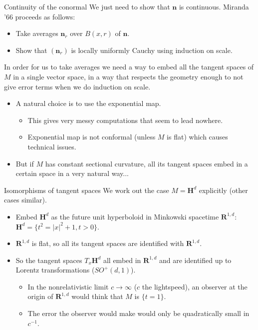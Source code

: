 \documentclass[10pt]{beamer}
\newcommand{\RR}{\mathbf{R}}
\newcommand{\Hyp}{\mathbf H}
\newcommand{\normal}{\mathbf n}
\begin{document}
\begin{frame}{Continuity of the conormal}
We just need to show that $\normal$ is continuous.
Miranda '66 proceeds as follows:\pause

\begin{itemize}
\item Take averages $\normal_r$ over $B(x, r)$ of $\normal$. \pause
\item Show that $(\normal_r)$ is locally uniformly Cauchy using induction on scale.\pause
\end{itemize}

In order for us to take averages we need a way to embed all the tangent spaces of $M$ in a single vector space, in a way that respects the geometry enough to not give error terms when we do induction on scale.\pause
\begin{itemize}
\item A natural choice is to use the exponential map.\pause
\begin{itemize}
\item This gives very messy computations that seem to lead nowhere.\pause
\item Exponential map is not conformal (unless $M$ is flat) which causes technical issues.\pause
\end{itemize}
\item But if $M$ has constant sectional curvature, all its tangent spaces embed in a certain space in a very natural way...
\end{itemize}
\end{frame}

\begin{frame}{Isomorphisms of tangent spaces}
We work out the case $M = \Hyp^d$ explicitly (other cases similar).\pause
\begin{itemize}
\item Embed $\Hyp^d$ as the future unit hyperboloid in Minkowski spacetime $\RR^{1, d}$: $\Hyp^d = \{t^2 = |x|^2 + 1, t > 0\}$.\pause
\item $\RR^{1, d}$ is flat, so all its tangent spaces are identified with $\RR^{1, d}$.\pause
\item So the tangent spaces $T_x\Hyp^d$ all embed in $\RR^{1, d}$ and are identified up to Lorentz transformations ($SO^+(d, 1)$).\pause
\begin{itemize}
\item In the nonrelativistic limit $c \to \infty$ ($c$ the lightspeed), an observer at the origin of $\RR^{1, d}$ would think that $M$ is $\{t = 1\}$.\pause
\item The error the observer would make would only be quadratically small in $c^{-1}$.
\end{itemize}
\end{itemize}
\end{frame}
\end{document}
